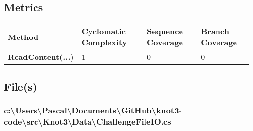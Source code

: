 \documentclass[a4paper,10pt]{article}
\begin{document}
\subsection{Metrics}
\begin{longtable}[l]{|l|l|l|l|}
\hline
\textbf{Method} & \textbf{Cyclomatic Complexity} & \textbf{Sequence Coverage} & \textbf{Branch Coverage}\\
\hline
\textbf{ReadContent(...)} & 1 & 0 & 0\\
\hline
\end{longtable}
\subsection{File(s)}
\subsubsection{c:\textbackslash Users\textbackslash Pascal\textbackslash Documents\textbackslash GitHub\textbackslash knot3-code\textbackslash src\textbackslash Knot3\textbackslash Data\textbackslash ChallengeFileIO.cs}
\end{document}

